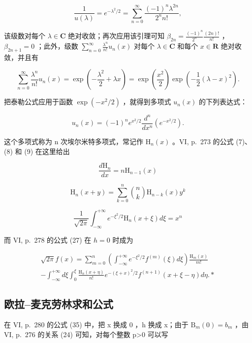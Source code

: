 \[
\frac {1}{u (\lambda)} = e ^ {- \lambda^ {2} / 2} = \sum_ {n = 0} ^ {\infty} \frac {(- 1) ^ {n} \lambda^ {2 n}}{2 ^ {n} n !},
\]

该级数对每个 \(\lambda \in \mathbf{C}\) 绝对收敛；再次应用该引理可知 \(\beta_{2n} = \frac{(-1)^n}{2^n}\frac{(2n)!}{n!}\) ，\(\beta_{2n+1} = 0\) ；此外，级数 \(\sum_{n=0}^{\infty}\frac{\lambda^n}{n!} u_n(x)\) 对每个 \(\lambda \in \mathbf{C}\) 和每个 \(x \in \mathbf{R}\) 绝对收敛，并且有

\[
\sum_ {n = 0} ^ {\infty} \frac {\lambda^ {n}}{n !} u _ {n} (x) = \exp \left(- \frac {\lambda^ {2}}{2} + \lambda x\right) = \exp \left(\frac {x ^ {2}}{2}\right) \exp \left(- \frac {1}{2} (\lambda - x) ^ {2}\right).
\]

把泰勒公式应用于函数 \(\exp(-x^2/2)\) ，就得到多项式 \(u_n(x)\) 的下列表达式：

\[
u _ {n} (x) = (- 1) ^ {n} e ^ {x ^ {2} / 2} \frac {d ^ {n}}{d x ^ {n}} (e ^ {- x ^ {2} / 2}).
\]

这个多项式称为 n 次埃尔米特多项式，常记作 \(\mathrm{H}_{n}(x)\) 。VI, p.~273 的公式 (7)、(8) 和 (9) 在这里给出

\[
\frac {d \mathrm{H} _ {n}}{d x} = n \mathrm{H} _ {n - 1} (x)
\]

\[
\mathrm{H} _ {n} (x + y) = \sum_ {k = 0} ^ {n} {\binom {n} {k}} \mathrm{H} _ {n - k} (x)   y ^ {k}
\]

\[
\frac {1}{\sqrt {2 \pi}} \int_ {- \infty} ^ {+ \infty} e ^ {- \xi^ {2} / 2} \mathrm{H} _ {n} (x + \xi) d \xi = x ^ {n}
\]

而 VI, p.~278 的公式 (27) 在 \(h = 0\) 时成为

\[
\begin{array}{l} \sqrt {2 \pi} f (x) = \sum_ {m = 0} ^ {n} \left(\int_ {- \infty} ^ {+ \infty} e ^ {- \xi^ {2} / 2} f ^ {(m)} (\xi) d \xi\right) \frac {\mathrm{H} _ {m} (x)}{m !} \\ - \int_ {- \infty} ^ {+ \infty} d \xi \int_ {0} ^ {\xi} \frac {\mathrm{H} _ {n} (x + \eta)}{n !} e ^ {- (\xi + x) ^ {2} / 2} f ^ {(n + 1)} (x + \xi - \eta) d \eta . * \end{array}
\]

\subsection{欧拉–麦克劳林求和公式}

在 VI, p.~280 的公式 (35) 中，把 x 换成 0 ，h 换成 x；由于 \(\mathrm{B}_{m}(0)=b_{m}\) ，由 VI, p.~276 的关系 (24) 可知，对每个整数 p\textgreater0 可以写


